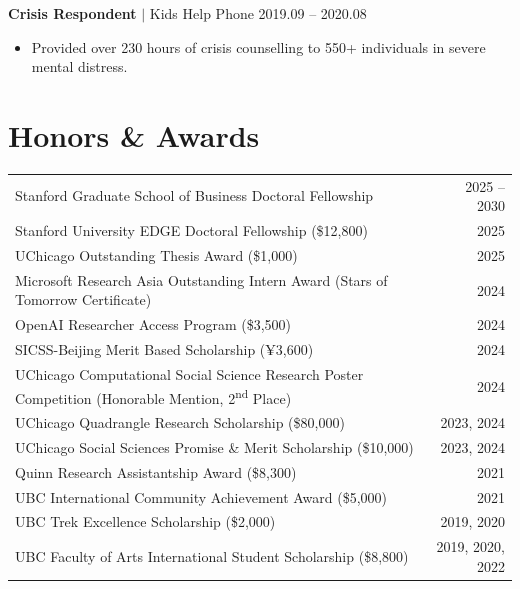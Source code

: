 \documentclass[11pt,letterpaper]{article}
\begin{document}
\vspace{0.5em}

\noindent\textbf{Crisis Respondent} $|$ Kids Help Phone \hfill 2019.09 -- 2020.08
\begin{itemize}
    \item Provided over 230 hours of crisis counselling to 550+ individuals in severe mental distress.
\end{itemize}

\section*{Honors \& Awards}

\noindent
\begin{tabularx}{\textwidth}{Xr}
Stanford Graduate School of Business Doctoral Fellowship & 2025 -- 2030 \\
Stanford University EDGE Doctoral Fellowship (\$12,800) & 2025 \\
UChicago Outstanding Thesis Award (\$1,000) & 2025 \\
Microsoft Research Asia Outstanding Intern Award (Stars of Tomorrow Certificate) & 2024 \\
OpenAI Researcher Access Program (\$3,500) & 2024 \\
SICSS-Beijing Merit Based Scholarship (¥3,600) & 2024 \\
UChicago Computational Social Science Research Poster Competition (Honorable Mention, 2\textsuperscript{nd} Place) & 2024 \\
UChicago Quadrangle Research Scholarship (\$80,000) & 2023, 2024 \\
UChicago Social Sciences Promise \& Merit Scholarship (\$10,000) & 2023, 2024 \\
Quinn Research Assistantship Award (\$8,300) & 2021 \\
UBC International Community Achievement Award (\$5,000) & 2021 \\
UBC Trek Excellence Scholarship (\$2,000) & 2019, 2020 \\
UBC Faculty of Arts International Student Scholarship (\$8,800) & 2019, 2020, 2022 \\
\end{tabularx}
\end{document}
